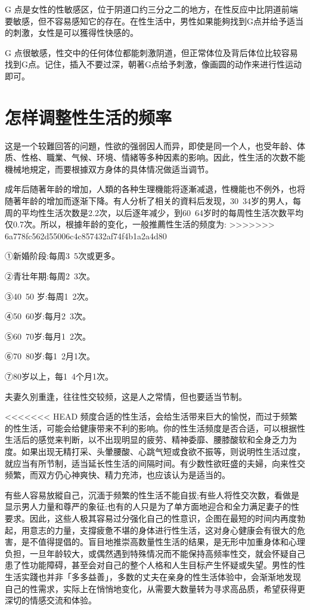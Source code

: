 \documentclass[12pt,UTF8]{ctexbook}
\begin{document}
G 点是女性的性敏感区，位于阴道口约三分之二的地方，在性反应中比阴道前端要敏感，但不容易感知它的存在。在性生活中，男性如果能夠找到G点并给予适当的刺激，女性是可以獲得性快感的。

G 点很敏感，性交中的任何体位都能刺激阴道，但正常体位及背后体位比较容易找到G点。记住，插入不要过深，朝著G点给予刺激，像画圆的动作来进行性运动即可。

\section{怎样调整性生活的频率}

这是一个较難回答的问題，性欲的强弱因人而异，即使是同一个人，也受年龄、体质、性格、職業、气候、环境、情緒等多种因素的影响。因此，性生活的次数不能機械地規定，而要根據双方身体的具体情况做适当调节。

成年后随著年龄的增加，人類的各种生理機能将逐漸减退，性機能也不例外，也将随著年龄的增加而逐渐下降。有人分析了相关的資料后发现，30~34岁的男人，每周的平均性生活次数是2.2次，以后逐年减少，到60~64岁时的每周性生活次数平均仅0.7次。所以，根據年龄的变化，一般推薦性生活的频度为:
>>>>>>> 6a778fc562d55006c4c857432af74f4b1a2a4d80

①新婚阶段:每周3~5次或更多。

②青壮年期:每周2~3次。

③40~50 岁:每周1~2次。

④50~60岁:每月2~3次。

⑤60~70岁:每月1~2次。

⑥70~80岁:每1~2月1次。

⑦80岁以上，每1~4个月1次。

夫妻久別重逢，往往性交较频，这是人之常情，但也要适当节制。

<<<<<<< HEAD
频度合适的性生活，会给生活带来巨大的愉悦，而过于频繁的性生活，可能会给健康带来不利的影响。你的性生活频度是否合适，可以根据性生活后的感觉来判断，以不出现明显的疲劳、精神委靡、腰膝酸软和全身乏力为度。如果出现无精打采、头暈腰酸、心跳气短或食欲不振等，则说明性生活过度，就应当有所节制，适当延长性生活的间隔时间。有少数性欲旺盛的夫婦，向来性交频繁，而双方仍心神爽快、精力充沛，也应该认为是适当的。

有些人容易放縱自己，沉湎于频繁的性生活不能自拔;有些人将性交次数，看做是显示男人力量和尊严的象征;也有的人只是为了单方面地迎合和全力满足妻子的性要求。因此，这些人极其容易过分强化自己的性意识，企图在最短的时间内再度勃起，用意志的力量，支撐疲惫不堪的身体进行性生活，这对身心健康会有很大的危害，是不值得提倡的。盲目地推崇高数量性生活的结果，是无形中加重身体和心理负担，一旦年龄较大，或偶然遇到特殊情况而不能保持高频率性交，就会怀疑自己患了性功能障碍，甚至会对自己的整个人格和人生目标产生怀疑或失望。男性的性生活实踐也并非「多多益善」，多数的丈夫在亲身的性生活体验中，会渐渐地发现自己的性需求，实际上在悄悄地变化，从需要大数量转为寻求高品质，希望获得更深切的情感交流和体验。
\end{document}
